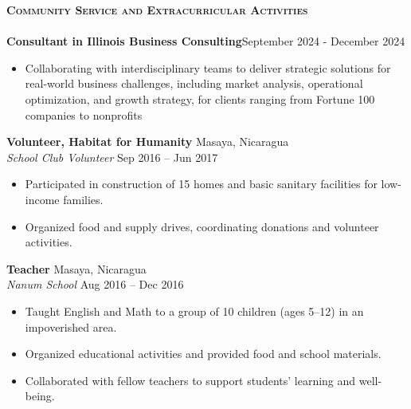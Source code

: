\documentclass[a4paper]{article}
\newcommand{\lineunder} {
    \vspace*{-8pt} \\
    \hspace*{-18pt} \hrulefill \\
}
\newcommand{\header} [1] {
    {\hspace*{-18pt}\vspace*{6pt} \textsc{#1}}
    \vspace*{-6pt} \lineunder
}
\begin{document}
\header{\textbf{Community Service and Extracurricular Activities}}

\textbf{Consultant in Illinois Business Consulting}\hfill September 2024 - December 2024\\
\begin{itemize}[nolistsep]
    \item Collaborating with interdisciplinary teams to deliver strategic solutions 
    for real-world business challenges, including market analysis, 
    operational optimization, and growth strategy, for clients ranging from Fortune 
    100 companies to nonprofits
\end{itemize} 

\vspace{1mm}

\textbf{Volunteer, Habitat for Humanity} \hfill Masaya, Nicaragua\\
\emph{School Club Volunteer} \hfill Sep 2016 -- Jun 2017\\
\begin{itemize}[noitemsep]
  \item Participated in construction of 15 homes and basic sanitary facilities for low-income families.
  \item Organized food and supply drives, coordinating donations and volunteer activities.
\end{itemize}

\vspace{1mm}

\textbf{Teacher} \hfill Masaya, Nicaragua\\
\emph{Nanum School} \hfill Aug 2016 -- Dec 2016\\
\begin{itemize}[noitemsep]
  \item Taught English and Math to a group of 10 children (ages 5--12) in an impoverished area.
  \item Organized educational activities and provided food and school materials.
  \item Collaborated with fellow teachers to support students' learning and well-being.
\end{itemize}
\end{document}
